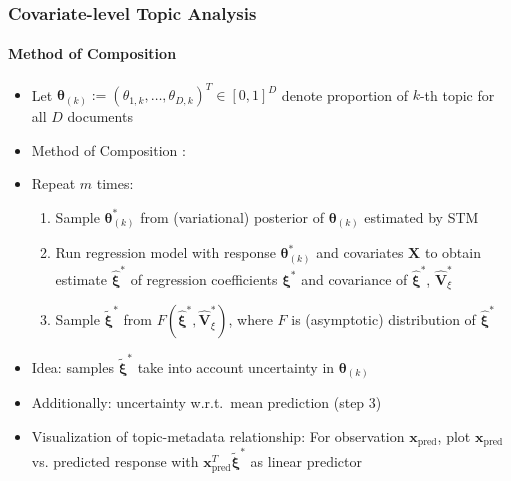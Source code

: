 \documentclass[xcolor=dvipsnames]{beamer}
\begin{document}
\begin{frame}
\frametitle{Covariate-level Topic Analysis}
\framesubtitle{Method of Composition}
\begin{itemize}
\item Let $\boldsymbol{\theta}_{(k)}:=(\theta_{1,k}, \dots, \theta_{D,k})^T \in [0,1]^{D}$ denote proportion of $k$-th topic for all $D$ documents
\item Method of Composition \parencite{treier2008democracy}:
\item[] Repeat $m$ times:
\begin{enumerate}
\item Sample $\boldsymbol{\theta}^*_{(k)}$ from (variational) posterior of $\boldsymbol{\theta}_{(k)}$ estimated by STM
\item Run regression model with response $\boldsymbol{\theta}^*_{(k)}$ and covariates $\boldsymbol{X}$ to obtain estimate $\hat{\boldsymbol{\xi}}^*$ of regression coefficients $\boldsymbol{\xi}^*$ and covariance of $\hat{\boldsymbol{\xi}}^*$, $\hat{\boldsymbol{V}}^*_{\xi}$
\item Sample $\tilde{\boldsymbol{\xi}}^*$ from $F(\hat{\boldsymbol{\xi}}^*, \hat{\boldsymbol{V}}^*_{\xi})$, where $F$ is (asymptotic) distribution of $\hat{\boldsymbol{\xi}}^*$
\end{enumerate}
\item Idea: samples $\tilde{\boldsymbol{\xi}}^*$ take into account uncertainty in $\boldsymbol{\theta}_{(k)}$
\item Additionally: uncertainty w.r.t.\ mean prediction (step 3)
\item Visualization of topic-metadata relationship: For observation $\boldsymbol{x}_{\text{pred}}$, plot $\boldsymbol{x}_{\text{pred}}$ vs. predicted response with $\boldsymbol{x}_{\text{pred}}^T \tilde{\boldsymbol{\xi}}^*$ as linear predictor
\end{itemize}
\end{frame}
\end{document}
